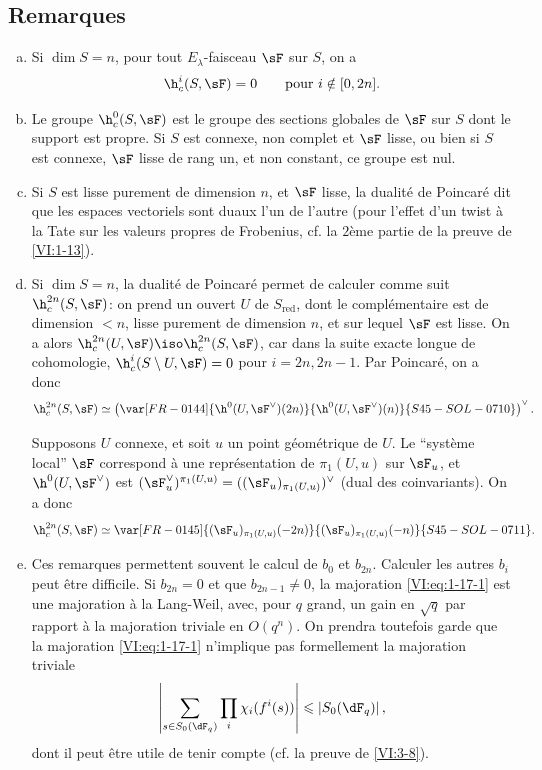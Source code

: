 \subsection{Remarques}\label{VI:1-18}

\begin{enumerate}[a)]
  \item Si $\dim S=n$, pour tout $E_\lambda$-faisceau $\sF$ sur $S$, on a 
    \[
      \h_c^i(S,\sF) = 0 \qquad \text{pour $i\notin [0,2n]$.}
    \]
  \item Le groupe $\h_c^0(S,\sF)$ est le groupe des sections globales de $\sF$ 
    sur $S$ dont le support est propre. Si $S$ est connexe, non complet et 
    $\sF$ lisse, ou bien si $S$ est connexe, $\sF$ lisse de rang un, et non 
    constant, ce groupe est nul.
  \item Si $S$ est lisse purement de dimension $n$, et $\sF$ lisse, la 
    dualité de Poincaré dit que les espaces vectoriels 
     sont duaux l'un de l'autre 
    (pour l'effet d'un twist à la Tate sur les valeurs propres de Frobenius, 
    cf. la $2$ème partie de la preuve de \ref{VI:1-13}).
  \item Si $\dim S=n$, la dualité de Poincaré permet de calculer comme 
    suit $\h_c^{2n}(S,\sF)$: on prend un ouvert $U$ de $S_\text{red}$, dont le 
    complémentaire est de dimension $<n$, lisse purement de dimension $n$, et 
    sur lequel $\sF$ est lisse. On a alors 
    $\h_c^{2n}(U,\sF) \iso \h_c^{2n}(S,\sF)$, car dans la suite exacte longue 
    de cohomologie, $\h_c^i(S\setminus U,\sF) = 0$ pour $i=2n,2n-1$. Par 
    Poincaré, on a donc 
    \[
      \h_c^{2n}(S,\sF) \simeq \left(\var[FR-0144]{\h^0(U,\sF^\vee)(2n)}{\h^0(U,\sF^\vee)(n)}{S45-SOL-0710}\right)^\vee \text{.}
    \]
    
    Supposons $U$ connexe, et soit $u$ un point géométrique de $U$. Le 
    ``système local'' $\sF$ correspond à une représentation de 
    $\pi_1(U,u)$ sur $\sF_u$, et $\h^0(U,\sF^\vee)$ est 
    $(\sF_u^\vee)^{\pi_1(U,u)}=((\sF_u)_{\pi_1(U,u)})^\vee$ (dual des 
    coinvariants). On a donc 
\[
      \h_c^{2n}(S,\sF) \simeq \var[FR-0145]{(\sF_u)_{\pi_1(U,u)}(-2n)}{(\sF_u)_{\pi_1(U,u)}(-n)}{S45-SOL-0711} \text{.}
    \]
  \item Ces remarques permettent souvent le calcul de $b_0$ et $b_{2n}$. 
    Calculer les autres $b_i$ peut être difficile. Si $b_{2n}=0$ et que 
    $b_{2n-1}\ne 0$, la majoration \eqref{VI:eq:1-17-1} est une majoration à la 
    Lang-Weil, avec, pour $q$ grand, un gain en $\sqrt q$ par rapport à la 
    majoration triviale en $O(q^n)$. On prendra toutefois garde que la 
    majoration \eqref{VI:eq:1-17-1} n'implique pas formellement la majoration 
    triviale 
    \[
      \left|\sum_{s\in S_0(\dF_q)} \prod_i \chi_i(f^i(s))\right| \leqslant \left| S_0(\dF_q)\right| \text{,}
    \]
    dont il peut être utile de tenir compte (cf. la preuve de \ref{VI:3-8}). 
\end{enumerate}

